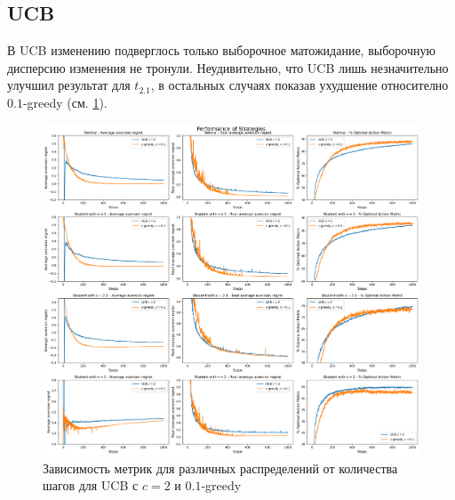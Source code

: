 \subsection{UCB}

В UCB изменению подверглось только выборочное матожидание, выборочную дисперсию изменения не тронули. Неудивительно, что UCB лишь незначительно улучшил результат для $t_{2.1}$, в остальных случаях показав ухудшение относително $0.1$-greedy (см. \ref{fig:ucb_compare_ucb_and_eps_greedy}).

\begin{figure}[ht!] %
\centering
\includegraphics[width=6in]{theory_tester/theory_images/UCB/compare_ucb_and_eps_greedy.png}
\caption{Зависимость метрик для различных распределений от количества шагов для UCB с $c=2$ и $0.1$-greedy}
\label{fig:ucb_compare_ucb_and_eps_greedy}
\end{figure}

